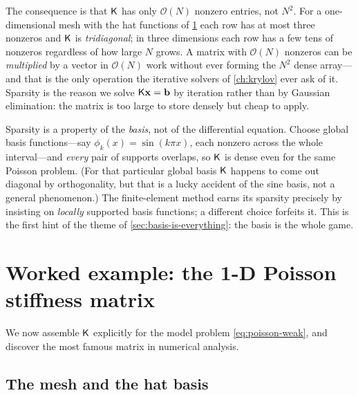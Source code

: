 The consequence is that $\mathsf{K}$ has only $\mathcal{O}(N)$ nonzero entries, not
$N^2$. For a one-dimensional mesh with the hat functions of
\cref{sec:worked-stiffness} each row has at most three nonzeros and $\mathsf{K}$ is
\emph{tridiagonal}; in three dimensions each row has a few tens of nonzeros
regardless of how large $N$ grows. A matrix with $\mathcal{O}(N)$ nonzeros can be
\emph{multiplied} by a vector in $\mathcal{O}(N)$ work without ever forming the
$N^2$ dense array---and that is the only operation the iterative solvers of
\cref{ch:krylov} ever ask of it. Sparsity is the reason we solve $\mathsf{K}\mathbf{x}=\mathbf{b}$
by iteration rather than by Gaussian elimination: the matrix is too large to store
densely but cheap to apply.

\begin{pitfall}
Sparsity is a property of the \emph{basis}, not of the differential equation.
Choose global basis functions---say $\phi_k(x)=\sin(k\pi x)$, each nonzero across
the whole interval---and \emph{every} pair of supports overlaps, so $\mathsf{K}$ is
dense even for the same Poisson problem. (For that particular global basis
$\mathsf{K}$ happens to come out diagonal by orthogonality, but that is a lucky
accident of the sine basis, not a general phenomenon.) The finite-element method
earns its sparsity precisely by insisting on \emph{locally} supported basis
functions; a different choice forfeits it. This is the first hint of the theme of
\cref{sec:basis-is-everything}: the basis is the whole game.
\end{pitfall}

\section{Worked example: the 1-D Poisson stiffness matrix}
\label{sec:worked-stiffness}

We now assemble $\mathsf{K}$ explicitly for the model problem
\cref{eq:poisson-weak}, and discover the most famous matrix in numerical analysis.

\subsection{The mesh and the hat basis}

